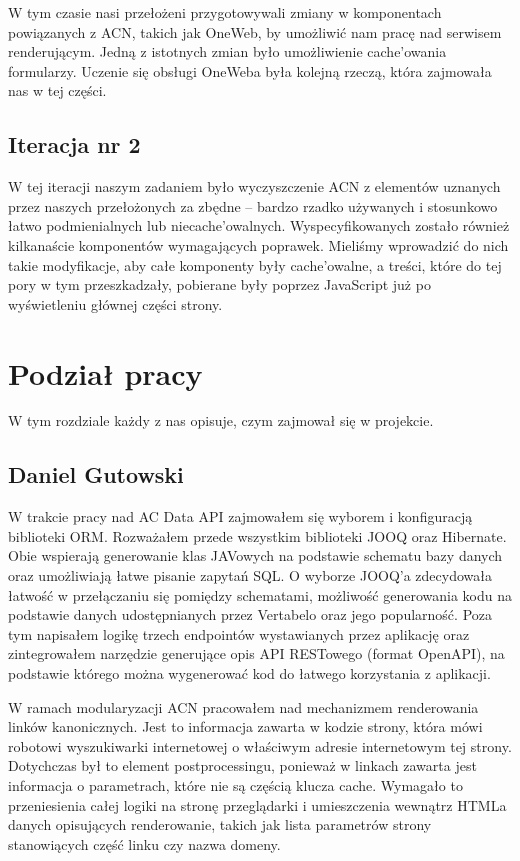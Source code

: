\documentclass[licencjacka]{pracamgr}
\begin{document}
\vspace{1mm}

W tym czasie nasi przełożeni przygotowywali zmiany w komponentach powiązanych z ACN, takich jak OneWeb, by umożliwić nam pracę nad serwisem renderującym. Jedną z istotnych zmian było umożliwienie cache’owania formularzy. Uczenie się obsługi OneWeba była kolejną rzeczą, która zajmowała nas w tej części.
	
\section{Iteracja nr 2}

W tej iteracji naszym zadaniem było wyczyszczenie ACN z elementów uznanych przez naszych przełożonych za zbędne – bardzo rzadko używanych i stosunkowo łatwo podmienialnych lub niecache’owalnych. Wyspecyfikowanych zostało również kilkanaście komponentów wymagających poprawek. Mieliśmy wprowadzić do nich takie modyfikacje, aby całe komponenty były cache’owalne, a treści, które do tej pory w tym przeszkadzały, pobierane były poprzez JavaScript już po wyświetleniu głównej części strony.

\chapter{Podział pracy}

W tym rozdziale każdy z nas opisuje, czym zajmował się w projekcie.

\section{Daniel Gutowski}

W trakcie pracy nad AC Data API zajmowałem się wyborem i konfiguracją biblioteki ORM. Rozważałem przede wszystkim biblioteki JOOQ oraz Hibernate. Obie wspierają generowanie klas JAVowych na podstawie schematu bazy danych oraz umożliwiają łatwe pisanie zapytań SQL. O wyborze JOOQ'a zdecydowała łatwość w przełączaniu się pomiędzy schematami, możliwość generowania kodu na podstawie danych udostępnianych przez Vertabelo oraz jego popularność.
Poza tym napisałem logikę trzech endpointów wystawianych przez aplikację oraz zintegrowałem narzędzie generujące opis API RESTowego (format OpenAPI), na podstawie którego można wygenerować kod do łatwego korzystania z aplikacji.

\vspace{1mm}

W ramach modularyzacji ACN pracowałem nad mechanizmem renderowania linków kanonicznych. Jest to informacja zawarta w kodzie strony, która mówi robotowi wyszukiwarki internetowej o właściwym adresie internetowym tej strony. Dotychczas był to element postprocessingu, ponieważ w linkach zawarta jest informacja o parametrach, które nie są częścią klucza cache. Wymagało to przeniesienia całej logiki na stronę przeglądarki i umieszczenia wewnątrz HTMLa danych opisujących renderowanie, takich jak lista parametrów strony stanowiących część linku czy nazwa domeny.
\end{document}
